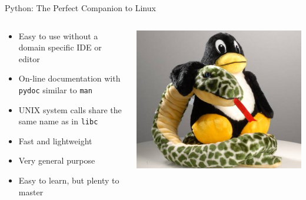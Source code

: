 \documentclass{lug}
\begin{document}
\begin{frame}{Python: The Perfect Companion to Linux}
    \begin{columns}
        \begin{column}{0.6\textwidth}
            \begin{itemize}[<+->]
                \item Easy to use without a domain specific IDE or editor
                \item On-line documentation with \texttt{pydoc} similar to
                    \texttt{man}
                \item UNIX system calls share the same name as in \texttt{libc}
                \item Fast and lightweight
                \item Very general purpose
                \item Easy to learn, but plenty to master
            \end{itemize}
        \end{column}
        \begin{column}{0.4\textwidth}
            \includegraphics[width=\textwidth]{graphics/tux_on_python}
        \end{column}
    \end{columns}
\end{frame}
\end{document}
